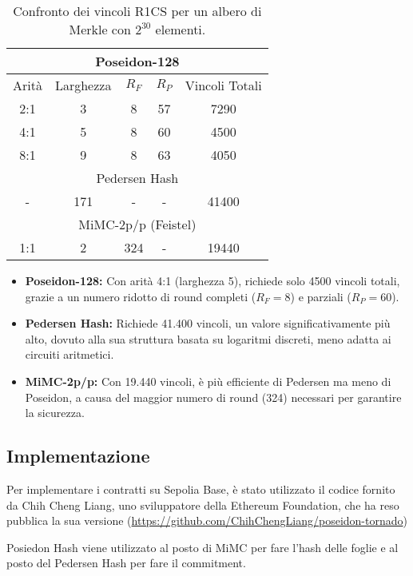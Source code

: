\begin{table}[h]
    \centering
    \begin{tabular}{|c|c|c|c|c|}
        \hline
        \multicolumn{5}{|c|}{Poseidon-128} \\
        \hline
        Arità & Larghezza & \(R_F\) & \(R_P\) & Vincoli Totali \\
        \hline
        2:1 & 3 & 8 & 57 & 7290 \\
        4:1 & 5 & 8 & 60 & 4500 \\
        8:1 & 9 & 8 & 63 & 4050 \\
        \hline
        \multicolumn{5}{|c|}{Pedersen Hash} \\
        \hline
        - & 171 & - & - & 41400 \\
        \hline
        \multicolumn{5}{|c|}{MiMC-2p/p (Feistel)} \\
        \hline
        1:1 & 2 & 324 & - & 19440 \\
        \hline
    \end{tabular}
    \caption{Confronto dei vincoli R1CS per un albero di Merkle con \(2^{30}\) elementi.}
\end{table}

\begin{itemize}
    \item \textbf{Poseidon-128:} Con arità 4:1 (larghezza 5), richiede solo 4500 vincoli totali, grazie a un numero ridotto di round completi (\(R_F = 8\)) e parziali (\(R_P = 60\)).
    \item \textbf{Pedersen Hash:} Richiede 41.400 vincoli, un valore significativamente più alto, dovuto alla sua struttura basata su logaritmi discreti, meno adatta ai circuiti aritmetici.
    \item \textbf{MiMC-2p/p:} Con 19.440 vincoli, è più efficiente di Pedersen ma meno di Poseidon, a causa del maggior numero di round (324) necessari per garantire la sicurezza.
\end{itemize}

\subsection{Implementazione}

Per implementare i contratti su Sepolia Base, è stato utilizzato il codice fornito da Chih Cheng Liang, uno sviluppatore della Ethereum Foundation, che ha reso pubblica la sua versione  (\url{https://github.com/ChihChengLiang/poseidon-tornado})

Posiedon Hash viene utilizzato al posto di MiMC per fare l'hash delle foglie e al posto del Pedersen Hash per fare il commitment.

